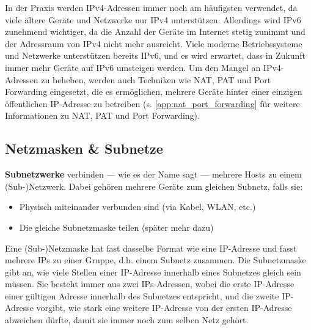 \begin{myremark}
	In der Praxis werden \gls{IP}v4-Adressen immer noch am häufigsten verwendet, da viele ältere Geräte und Netzwerke nur \gls{IP}v4 unterstützen. Allerdings wird \gls{IP}v6 zunehmend wichtiger, da die Anzahl der Geräte im Internet stetig zunimmt und der Adressraum von \gls{IP}v4 nicht mehr ausreicht. Viele moderne Betriebssysteme und Netzwerke unterstützen bereits \gls{IP}v6, und es wird erwartet, dass in Zukunft immer mehr Geräte auf \gls{IP}v6 umsteigen werden. Um den Mangel an \gls{IP}v4-Adressen zu beheben, werden auch Techniken wie \acrfull{NAT}, \acrfull{PAT} und Port Forwarding eingesetzt, die es ermöglichen, mehrere Geräte hinter einer einzigen öffentlichen \gls{IP}-Adresse zu betreiben (s. \cref{app:nat_port_forwarding} für weitere Informationen zu \acrshort{NAT}, \acrshort{PAT} und Port Forwarding).
\end{myremark}

\subsection{Netzmasken \& Subnetze}
\textbf{Subnetzwerke} verbinden --- wie es der Name sagt --- mehrere Hosts zu einem (Sub-)Netzwerk. Dabei gehören mehrere Geräte zum gleichen Subnetz, falls sie:
\begin{itemize}
	\item Physisch miteinander verbunden sind (via Kabel, \gls{WLAN}, etc.)
	\item Die gleiche Subnetzmaske teilen (später mehr dazu)
\end{itemize}

Eine (Sub-)Netzmaske hat fast dasselbe Format wie eine \gls{IP}-Adresse und fasst mehrere \glspl{IP} zu einer Gruppe, d.h. einem Subnetz zusammen. Die Subnetzmaske gibt an, wie viele Stellen einer \gls{IP}-Adresse innerhalb eines Subnetzes gleich sein müssen. Sie besteht immer aus zwei \glspl{IP}-Adressen, wobei die erste \gls{IP}-Adresse einer gültigen Adresse innerhalb des Subnetzes entspricht, und die zweite \gls{IP}-Adresse vorgibt, wie stark eine weitere \gls{IP}-Adresse von der ersten \gls{IP}-Adresse abweichen dürfte, damit sie immer noch zum selben Netz gehört.

